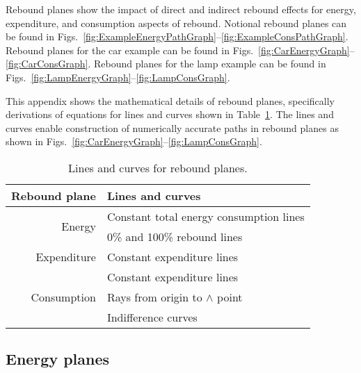 
Rebound planes show the impact of direct and indirect rebound effects
for energy, expenditure, and consumption aspects of rebound.
Notional rebound planes can be found in 
Figs.~\ref{fig:ExampleEnergyPathGraph}--\ref{fig:ExampleConsPathGraph}.
Rebound planes for the car example can be found in 
Figs.~\ref{fig:CarEnergyGraph}--\ref{fig:CarConsGraph}.
Rebound planes for the lamp example can be found in
Figs.~\ref{fig:LampEnergyGraph}--\ref{fig:LampConsGraph}.

This appendix shows the mathematical details of rebound planes,
specifically derivations of equations for lines and curves 
shown in Table~\ref{tab:lines_and_curves}.
The lines and curves enable construction of numerically accurate
paths in rebound planes
as shown in Figs.~\ref{fig:CarEnergyGraph}--\ref{fig:LampConsGraph}.

\begin{table}
\centering
\caption{Lines and curves for rebound planes.}
\label{tab:lines_and_curves}
\begin{tabular}{rl}
\toprule
Rebound plane                & Lines and curves                        \\ 
\midrule
\multirow{2}{*}{Energy}      & Constant total energy consumption lines \\
                             & 0\% and 100\% rebound lines             \\
\midrule
Expenditure                  & Constant expenditure lines              \\
\midrule
\multirow{3}{*}{Consumption} & Constant expenditure lines              \\
                             & Rays from origin to $\wedge$ point      \\
                             & Indifference curves                     \\
\bottomrule
\end{tabular}
\end{table}


\subsection{Energy planes}
\label{sec:energy_path_graph_details}

